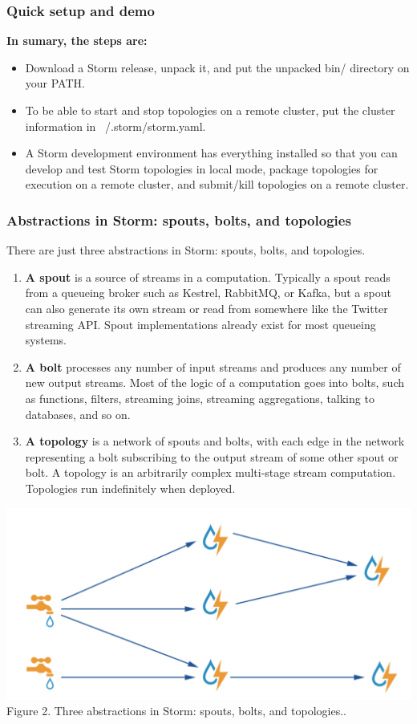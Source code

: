 \documentclass{hcmutarticle}
\begin{document}
\subsubsection{Quick setup and demo\\}
\textbf{In sumary, the steps are:}
\begin{itemize}
\item Download a Storm release, unpack it, and put the unpacked
bin/ directory on your PATH.
\item To be able to start and stop topologies on a remote
cluster, put the cluster information in ~/.storm/storm.yaml.
\item A Storm development environment has everything installed
so that you can develop and test Storm topologies in local mode,
package topologies for execution on a remote cluster, and
submit/kill topologies on a remote cluster.
\end{itemize}

\subsubsection{Abstractions in Storm: spouts, bolts, and
topologies\\}
There are just three abstractions in Storm: spouts, bolts, and
topologies.
\begin{enumerate}
\item \textbf{A spout} is a source of streams in a computation.
Typically a spout reads from a queueing broker such as Kestrel,
RabbitMQ, or Kafka, but a spout can also generate its own stream
or read from somewhere like the Twitter streaming API. Spout
implementations already exist for most queueing systems.
\item \textbf{A bolt} processes any number of input streams and
produces any number of new output streams. Most of the logic of
a computation goes into bolts, such as functions, filters,
streaming joins, streaming aggregations, talking to databases,
and so on.
\item \textbf{A topology} is a network of spouts and bolts, with
each edge in the network representing a bolt subscribing to the
output stream of some other spout or bolt. A topology is an
arbitrarily complex multi-stage stream computation. Topologies
run indefinitely when deployed.
\end{enumerate}
\begin{center}
\includegraphics[scale=0.6]{image/abstract-storm.png}\\[0.5cm]
Figure 2. Three abstractions in Storm: spouts, bolts, and
topologies..
\end{center}
\end{document}
